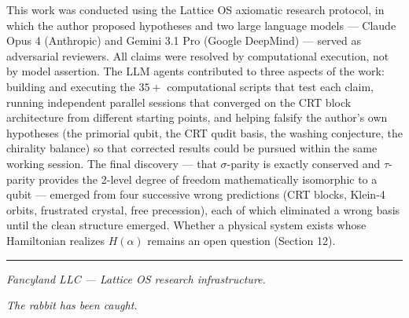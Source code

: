 \documentclass[11pt,letterpaper]{article}
\theoremstyle{definition}
\theoremstyle{remark}
\begin{document}
This work was conducted using the Lattice OS axiomatic research protocol, in which the author proposed hypotheses and two large language models --- Claude Opus 4 (Anthropic) and Gemini 3.1 Pro (Google DeepMind) --- served as adversarial reviewers. All claims were resolved by computational execution, not by model assertion. The LLM agents contributed to three aspects of the work: building and executing the $35{+}$ computational scripts that test each claim, running independent parallel sessions that converged on the CRT block architecture from different starting points, and helping falsify the author's own hypotheses (the primorial qubit, the CRT qudit basis, the washing conjecture, the chirality balance) so that corrected results could be pursued within the same working session. The final discovery --- that $\sigma$-parity is exactly conserved and $\tau$-parity provides the 2-level degree of freedom mathematically isomorphic to a qubit --- emerged from four successive wrong predictions (CRT blocks, Klein-4 orbits, frustrated crystal, free precession), each of which eliminated a wrong basis until the clean structure emerged. Whether a physical system exists whose Hamiltonian realizes $H(\alpha)$ remains an open question (Section 12).

\begin{center}
\vspace{2em}
\noindent\rule{0.5\linewidth}{0.5pt}
\vspace{1em}

\emph{Fancyland LLC --- Lattice OS research infrastructure.}

\emph{The rabbit has been caught.}
\end{center}
\end{document}
